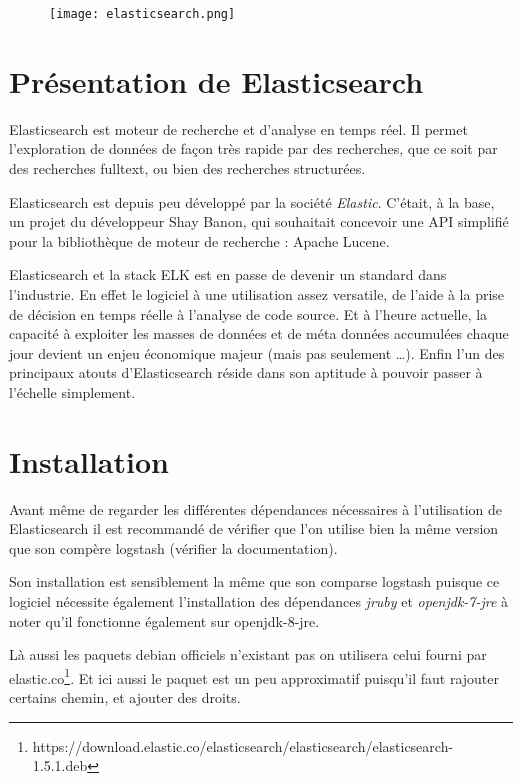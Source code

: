 \begin{figure}[H]
\center
\texttt{[image: elasticsearch.png]}
\label{fig:elasticsearchlogo.png}
\end{figure}
\section{Présentation de Elasticsearch}
Elasticsearch est moteur de recherche et d'analyse en temps réel. Il permet l'exploration
de données de façon très rapide par des recherches, que ce soit par des recherches
\gls{fulltext}, ou bien des recherches structurées.

Elasticsearch est depuis peu développé par la société \emph{Elastic}. C'était, à 
la base, un projet du développeur Shay Banon, qui souhaitait concevoir une API simplifié
pour la bibliothèque de moteur de recherche : Apache Lucene.

Elasticsearch et la stack ELK est en passe de devenir un standard dans l'industrie.
En effet le logiciel à une utilisation assez versatile, de l'aide à la prise de 
décision en temps réelle à l'analyse de code source. Et à l'heure actuelle, la capacité 
à exploiter les masses de données et de méta données accumulées chaque jour devient 
un enjeu économique majeur (mais pas seulement \ldots). Enfin l'un des principaux 
atouts d'Elasticsearch réside dans son aptitude à pouvoir passer à l'échelle simplement.

\section{Installation}
Avant même de regarder les différentes dépendances nécessaires à l'utilisation de
Elasticsearch il est recommandé de vérifier que l'on utilise bien la même version
que son compère logstash (vérifier la documentation).

Son installation est sensiblement la même que son comparse logstash puisque ce logiciel 
nécessite également l'installation des dépendances \emph{jruby} et \emph{openjdk-7-jre}
à noter qu'il fonctionne également sur openjdk-8-jre.

Là aussi les paquets debian officiels n'existant pas on utilisera celui fourni par 
elastic.co\footnote{https://download.elastic.co/elasticsearch/elasticsearch/elasticsearch-1.5.1.deb}.
Et ici aussi le paquet est un peu approximatif puisqu'il faut rajouter certains chemin, et ajouter des droits.




